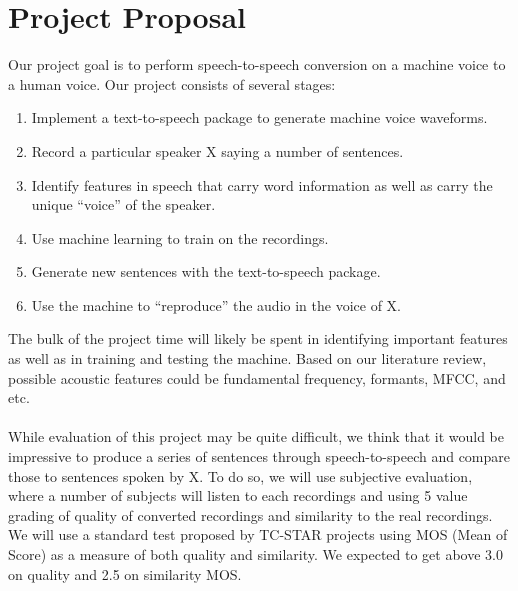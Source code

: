 \documentclass[11pt]{article}
\begin{document}
\section{Project Proposal}
Our project goal is to perform speech-to-speech conversion on a machine voice to a human voice. Our project consists of several stages:
\begin{enumerate}
\item Implement a text-to-speech package to generate machine voice waveforms.
\item Record a particular speaker X saying a number of sentences.
\item Identify features in speech that carry word information as well as carry the unique ``voice'' of the speaker.
\item Use machine learning  to train on the recordings.
\item Generate new sentences with the text-to-speech package.
\item Use the machine to ``reproduce'' the audio in the voice of X.
\end{enumerate}
The bulk of the project time will likely be spent in identifying important features as well as in training and testing the machine. Based on our literature review, possible acoustic features could be fundamental frequency, formants, MFCC, and etc. \\
\\
While evaluation of this project may be quite difficult, we think that it would be impressive to produce a series of sentences through speech-to-speech and compare those to sentences spoken by X. To do so, we will use subjective evaluation, where a number of subjects will listen to each recordings and using 5 value grading of quality of converted recordings and similarity to the real recordings. We will use a standard test proposed by TC-STAR\cite{erro2007weighted} projects using MOS (Mean of Score) as a measure of both quality and similarity. We expected to get above 3.0 on quality and 2.5 on similarity MOS.



\end{document}
